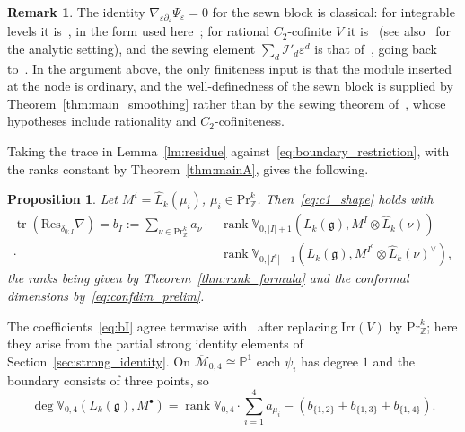 \documentclass[12pt,a4paper,reqno]{amsart}
\numberwithin{equation}{section}
\newtheorem{proposition}[theorem]{Proposition}
\theoremstyle{definition}
\newtheorem{remark}[theorem]{Remark}
\newcommand{\g}{\mathfrak{g}}
\newcommand{\rk}{\operatorname{rank}}
\newcommand{\tr}{\operatorname{tr}}
\newcommand{\Z}{\mathbb{Z}}
\renewcommand{\P}{\mathbb{P}}
\newcommand{\I}{\mathscr{I}}
\newcommand{\M}{\mathcal{M}}
\def\Pr{\mathrm{Pr}}
\def\o{\otimes}
\def\Res{\mathrm{Res}}
\def\VV{\mathbb{V}}
\begin{document}
\begin{remark}
The identity $\nabla_{\varepsilon\partial_\varepsilon}\Psi_\varepsilon=0$ for the sewn block is classical: for integrable levels it is~\cite[Lemma 34]{Loo13}, in the form used here~\cite[Proposition 2.10]{Fak12}; for rational $C_2$-cofinite $V$ it is~\cite[Remark 8.5.3]{DGT2arXiv} (see also~\cite{Gui24} for the analytic setting), and the sewing element $\sum_d\I'_d\varepsilon^d$ is that of~\cite[Section 8.5]{DGT2}, going back to~\cite[Lemma 8.7.1]{NT}. In the argument above, the only finiteness input is that the module inserted at the node is ordinary, and the well-definedness of the sewn block is supplied by Theorem~\ref{thm:main_smoothing} rather than by the sewing theorem of~\cite{DGT2}, whose hypotheses include rationality and $C_2$-cofiniteness.
\end{remark}

Taking the trace in Lemma~\ref{lm:residue} against~\eqref{eq:boundary_restriction}, with the ranks constant by Theorem~\ref{thm:mainA}, gives the following.

\begin{proposition}\label{prop:degree_formula}
Let $M^i=\hat{L}_k(\mu_i)$, $\mu_i\in \Pr^k_\Z$. Then~\eqref{eq:c1_shape} holds with
\begin{equation}\label{eq:bI}
\begin{split}
\tr\left(\Res_{\delta_{0:I}}\nabla\right)=b_I:=\sum_{\nu\in \Pr^k_\Z} a_\nu\cdot{}& \rk \VV_{0,|I|+1}\left(L_k(\g),M^I\o \hat{L}_k(\nu)\right)\\
{}\cdot{}& \rk \VV_{0,|I^c|+1}\left(L_k(\g),M^{I^c}\o \hat{L}_k(\nu)^\vee\right),
\end{split}
\end{equation}
the ranks being given by Theorem~\ref{thm:rank_formula} and the conformal dimensions by~\eqref{eq:confdim_prelim}.
\end{proposition}

The coefficients~\eqref{eq:bI} agree termwise with~\cite[(2.4)]{DG} after replacing $\mathrm{Irr}(V)$ by $\Pr^k_\Z$; here they arise from the partial strong identity elements of Section~\ref{sec:strong_identity}. On $\overline{\M}_{0,4}\cong\P^1$ each $\psi_i$ has degree $1$ and the boundary consists of three points, so
\begin{equation}\label{eq:deg_M04}
\deg \VV_{0,4}(L_k(\g),M^\bullet)=\rk \VV_{0,4}\cdot \sum_{i=1}^4 a_{\mu_i}-\left(b_{\{1,2\}}+b_{\{1,3\}}+b_{\{1,4\}}\right).
\end{equation}
\end{document}
